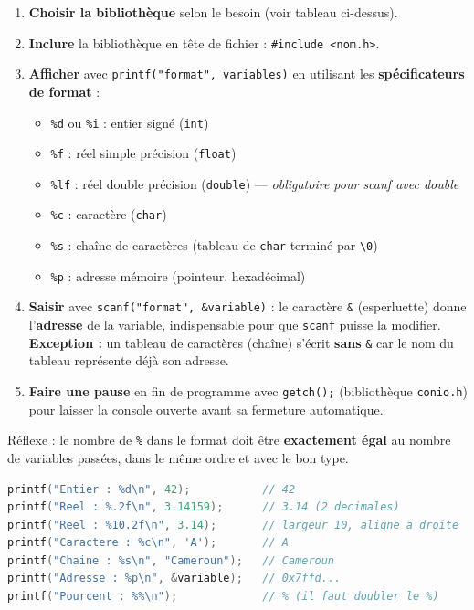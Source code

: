 \documentclass[11pt]{article}
\begin{document}
\begin{methode}
\begin{enumerate}
\item \textbf{Choisir la bibliothèque} selon le besoin (voir tableau ci-dessus).
\item \textbf{Inclure} la bibliothèque en tête de fichier : \texttt{\#include <nom.h>}.
\item \textbf{Afficher} avec \texttt{printf("format", variables)} en utilisant les \textbf{spécificateurs de format} :
\begin{itemize}
\item \texttt{\%d} ou \texttt{\%i} : entier signé (\texttt{int})
\item \texttt{\%f} : réel simple précision (\texttt{float})
\item \texttt{\%lf} : réel double précision (\texttt{double}) — \emph{obligatoire pour scanf avec double}
\item \texttt{\%c} : caractère (\texttt{char})
\item \texttt{\%s} : chaîne de caractères (tableau de \texttt{char} terminé par \texttt{\textbackslash 0})
\item \texttt{\%p} : adresse mémoire (pointeur, hexadécimal)
\end{itemize}
\item \textbf{Saisir} avec \texttt{scanf("format", \&variable)} : le caractère \texttt{\&} (esperluette) donne l'\textbf{adresse} de la variable, indispensable pour que \texttt{scanf} puisse la modifier. \textbf{Exception :} un tableau de caractères (chaîne) s'écrit \textbf{sans} \texttt{\&} car le nom du tableau représente déjà son adresse.
\item \textbf{Faire une pause} en fin de programme avec \texttt{getch();} (bibliothèque \texttt{conio.h}) pour laisser la console ouverte avant sa fermeture automatique.
\end{enumerate}
Réflexe : le nombre de \texttt{\%} dans le format doit être \textbf{exactement égal} au nombre de variables passées, dans le même ordre et avec le bon type.
\end{methode}

\begin{exemplebox}
\begin{lstlisting}[language=C]
printf("Entier : %d\n", 42);           // 42
printf("Reel : %.2f\n", 3.14159);      // 3.14 (2 decimales)
printf("Reel : %10.2f\n", 3.14);       // largeur 10, aligne a droite
printf("Caractere : %c\n", 'A');       // A
printf("Chaine : %s\n", "Cameroun");   // Cameroun
printf("Adresse : %p\n", &variable);   // 0x7ffd...
printf("Pourcent : %%\n");             // % (il faut doubler le %)
\end{lstlisting}
\end{exemplebox}
\end{document}
